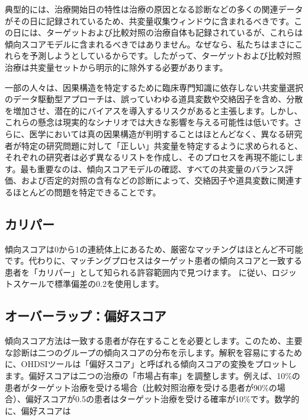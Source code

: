 \documentclass[
  11pt]{book}
\makeatletter
\newenvironment{kframe}{%
\medskip{}
\setlength{\fboxsep}{.8em}
 \def\at@end@of@kframe{}%
 \ifinner\ifhmode%
  \def\at@end@of@kframe{\end{minipage}}%
  \begin{minipage}{\columnwidth}%
 \fi\fi%
 \def\FrameCommand##1{\hskip\@totalleftmargin \hskip-\fboxsep
 \colorbox{myShadeColor}{##1}\hskip-\fboxsep
     \hskip-\linewidth \hskip-\@totalleftmargin \hskip\columnwidth}%
 \MakeFramed {\advance\hsize-\width
   \@totalleftmargin\z@ \linewidth\hsize
   \@setminipage}}%
 {\par\unskip\endMakeFramed%
 \at@end@of@kframe}
\newenvironment{rmdblock}[1]
  {
  \begin{itemize}
  \renewcommand{\labelitemi}{
    \raisebox{-.7\height}[0pt][0pt]{
      {\setkeys{Gin}{width=3em,keepaspectratio}\texttt{[image: images/\#1]}}
    }
  }
  \setlength{\fboxsep}{1em}
  \begin{kframe}
  \item
  }
  {
  \end{kframe}
  \end{itemize}
  }
\newenvironment{rmdimportant}
  {\begin{rmdblock}{important}}
  {\end{rmdblock}}
\theoremstyle{definition}
\theoremstyle{definition}
\theoremstyle{definition}
\theoremstyle{definition}
\theoremstyle{remark}
\makeatother
\begin{document}
\begin{rmdimportant}
典型的には、治療開始日の特性は治療の原因となる診断などの多くの関連データがその日に記録されているため、共変量収集ウィンドウに含まれるべきです。この日には、ターゲットおよび比較対照の治療自体も記録されているが、これらは傾向スコアモデルに含まれるべきではありません。なぜなら、私たちはまさにこれらを予測しようとしているからです。したがって、ターゲットおよび比較対照治療は共変量セットから明示的に除外する必要があります。
\end{rmdimportant}

一部の人々は、因果構造を特定するために臨床専門知識に依存しない共変量選択のデータ駆動型アプローチは、誤っていわゆる道具変数や交絡因子を含め、分散を増加させ、潜在的にバイアスを導入するリスクがあると主張します。しかし、これらの懸念は現実的なシナリオでは大きな影響を与える可能性は低いです。さらに、医学においては真の因果構造が判明することはほとんどなく、異なる研究者が特定の研究問題に対して「正しい」共変量を特定するように求められると、それぞれの研究者は必ず異なるリストを作成し、そのプロセスを再現不能にします。最も重要なのは、傾向スコアモデルの確認、すべての共変量のバランス評価、および否定的対照の含有などの診断によって、交絡因子や道具変数に関連するほとんどの問題を特定できることです。  

\subsection{カリパー}\label{ux30abux30eaux30d1ux30fc}


傾向スコアは0から1の連続体上にあるため、厳密なマッチングはほとんど不可能です。代わりに、マッチングプロセスはターゲット患者の傾向スコアと一致する患者を「カリパー」として知られる許容範囲内で見つけます。\citet{austin_2011} に従い、ロジットスケールで標準偏差の0.2を使用します。

\subsection{オーバーラップ：偏好スコア}\label{ux30aaux30fcux30d0ux30fcux30e9ux30c3ux30d7ux504fux597dux30b9ux30b3ux30a2}


傾向スコア方法は一致する患者が存在することを必要とします。このため、主要な診断は二つのグループの傾向スコアの分布を示します。解釈を容易にするために、OHDSIツールは「偏好スコア」と呼ばれる傾向スコアの変換をプロットします。偏好スコアは二つの治療の「市場占有率」を調整します。例えば、10\%の患者がターゲット治療を受ける場合（比較対照治療を受ける患者が90\%の場合）、偏好スコアが0.5の患者はターゲット治療を受ける確率が10\%です。数学的に、偏好スコアは
\end{document}
